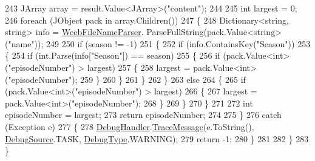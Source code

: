 \begin{DoxyCode}
243                     JArray array = result.Value<JArray>(\textcolor{stringliteral}{"content"});
244 
245                     \textcolor{keywordtype}{int} largest = 0;
246                     \textcolor{keywordflow}{foreach} (JObject pack \textcolor{keywordflow}{in} array.Children())
247                     \{
248                         Dictionary<string, string> info = \mbox{\hyperlink{class_little_weeb_library_1_1_handlers_1_1_nibl_handler_a0aae159f51f737bbb89946b8fe8c8743}{WeebFileNameParser}}.
      ParseFullString(pack.Value<\textcolor{keywordtype}{string}>(\textcolor{stringliteral}{"name"}));
249 
250                         \textcolor{keywordflow}{if} (season != -1)
251                         \{
252                             \textcolor{keywordflow}{if} (info.ContainsKey(\textcolor{stringliteral}{"Season"}))
253                             \{
254                                 \textcolor{keywordflow}{if} (\textcolor{keywordtype}{int}.Parse(info[\textcolor{stringliteral}{"Season"}]) == season)
255                                 \{
256                                     \textcolor{keywordflow}{if} (pack.Value<\textcolor{keywordtype}{int}>(\textcolor{stringliteral}{"episodeNumber"}) > largest)
257                                     \{
258                                         largest = pack.Value<\textcolor{keywordtype}{int}>(\textcolor{stringliteral}{"episodeNumber"});
259                                     \}
260                                 \}
261                             \}
262                         \}
263                         \textcolor{keywordflow}{else}
264                         \{
265                             \textcolor{keywordflow}{if} (pack.Value<\textcolor{keywordtype}{int}>(\textcolor{stringliteral}{"episodeNumber"}) > largest)
266                             \{
267                                 largest = pack.Value<\textcolor{keywordtype}{int}>(\textcolor{stringliteral}{"episodeNumber"});
268                             \}
269                         \}
270                     \}
271 
272                     \textcolor{keywordtype}{int} episodeNumber = largest;
273                     \textcolor{keywordflow}{return} episodeNumber;
274                     
275                 \}
276                 \textcolor{keywordflow}{catch} (Exception e)
277                 \{
278                     \mbox{\hyperlink{class_little_weeb_library_1_1_handlers_1_1_nibl_handler_a334c2111588fa71d1203bd8cbb572970}{DebugHandler}}.\mbox{\hyperlink{interface_little_weeb_library_1_1_handlers_1_1_i_debug_handler_a2e405bc3492e683cd3702fae125221bc}{TraceMessage}}(e.ToString(), 
      \mbox{\hyperlink{namespace_little_weeb_library_1_1_handlers_a2a6ca0775121c9c503d58aa254d292be}{DebugSource}}.TASK, \mbox{\hyperlink{namespace_little_weeb_library_1_1_handlers_ab66019ed40462876ec4e61bb3ccb0a62}{DebugType}}.WARNING);
279                     \textcolor{keywordflow}{return} -1;
280                 \}
281 
282             \}
283         \}
\end{DoxyCode}
